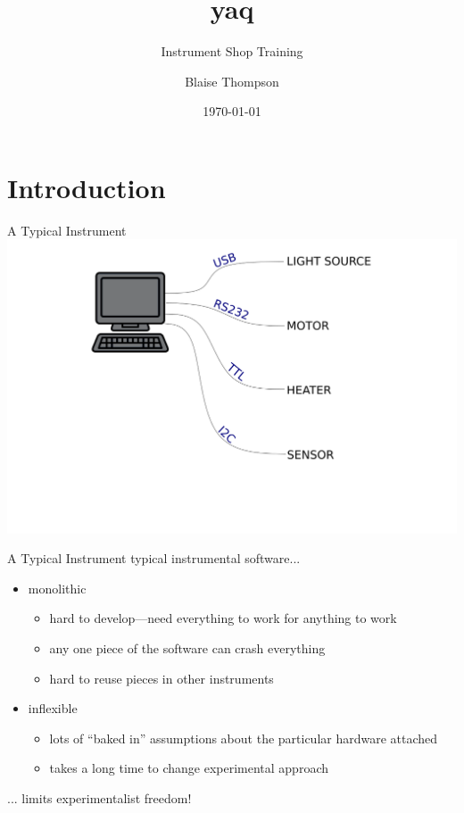 \documentclass{presentation}
\title{yaq}
\subtitle{Instrument Shop Training}
\author{Blaise Thompson}
\institute{University of Wisconsin--Madison}
\date{\today}
\begin{document}
\maketitle

\section{Introduction}

\begin{frame}{A Typical Instrument}
  \includegraphics[width=\textwidth]{./instrument.png}
\end{frame}

\begin{frame}{A Typical Instrument}
  typical instrumental software...
  \begin{itemize}
    \item monolithic
    \begin{itemize}
      \item hard to develop---need everything to work for anything to work
      \item any one piece of the software can crash everything
      \item hard to reuse pieces in other instruments
    \end{itemize}
    \item inflexible
    \begin{itemize}
      \item lots of ``baked in'' assumptions about the particular hardware attached
      \item takes a long time to change experimental approach
    \end{itemize}
  \end{itemize}
  ... limits experimentalist freedom!
\end{frame}
\end{document}

